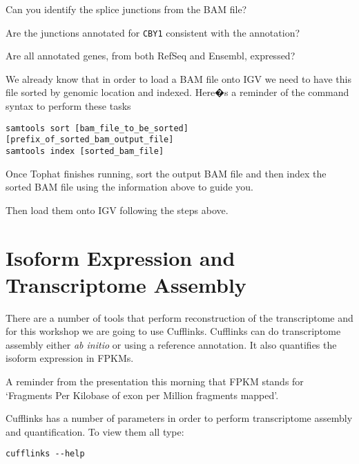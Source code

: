 \begin{questions}
Can you identify the splice junctions from the BAM file?
\begin{answer}
\end{answer}

Are the junctions annotated for \texttt{CBY1} consistent with the annotation?
\begin{answer}
\end{answer}

Are all annotated genes, from both RefSeq and Ensembl, expressed?
\begin{answer}
\end{answer}

\end{questions}

\begin{information}
We already know that in order to load a BAM file onto IGV we need to have
this file sorted by genomic location and indexed. Here�s a reminder of the
command syntax to perform these tasks

\begin{lstlisting}
samtools sort [bam_file_to_be_sorted] [prefix_of_sorted_bam_output_file]
samtools index [sorted_bam_file]
\end{lstlisting}

\end{information}

\begin{steps}
Once Tophat finishes running, sort the output BAM file and then index the
sorted BAM file using the information above to guide you.

Then load them onto IGV following the steps above.
\end{steps}

\newpage
\section{Isoform Expression and Transcriptome Assembly}
There are a number of tools that perform reconstruction of the transcriptome
and for this workshop we are going to use Cufflinks. Cufflinks can do
transcriptome assembly either \textit{ab initio} or using a reference annotation. It
also quantifies the isoform expression in FPKMs.

A reminder from the presentation this morning that FPKM stands for `Fragments
Per Kilobase of exon per Million fragments mapped'. 

\begin{steps}
Cufflinks has a number of parameters in order to perform transcriptome
assembly and quantification. To view them all type:

\begin{lstlisting}
cufflinks --help
\end{lstlisting}
\end{steps}

